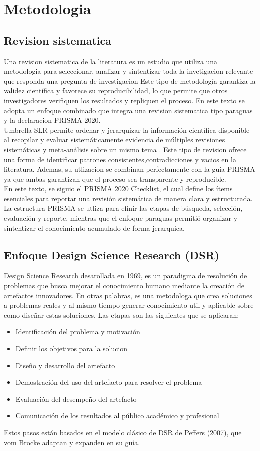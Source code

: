 \chapter{Metodologia}
\section{Revision sistematica}
Una revision sistematica de la literatura es un estudio 
que utiliza una metodologia para seleccionar, analizar y 
sintentizar toda la invetigacion relevante que responda una pregunta de investigacion 
Este tipo de metodología garantiza la validez científica y favorece su reproducibilidad, lo que permite que otros investigadores verifiquen los resultados 
y repliquen el proceso. En este texto se adopta un enfoque combinado que integra una revision sistematica
tipo paraguas y la declaracion PRISMA 2020.\\
Umbrella SLR permite ordenar y jerarquizar la información científica disponible al recopilar y evaluar sistemáticamente evidencia de múltiples revisiones sistemáticas y 
meta-análisis sobre un mismo tema \cite{Papatheodorou2019}. Este tipo de revision ofrece una forma de identificar patrones consistentes,contradicciones y vacios en la literatura. 
Ademas, su utlizacion se combinan perfectamente con la guia PRISMA ya que ambas garantizan que el proceso sea transparente y reproducible.\\
En este texto, se siguio el PRISMA 2020 Checklist, el cual define los ítems esenciales para reportar una revisión sistemática de manera clara y estructurada.
La estructura PRISMA se utliza para efinir las etapas de búsqueda, selección, evaluación y reporte, mientras que el enfoque paraguas permitió organizar y sintentizar el conocimiento acumulado de forma jerarquica.
\section{Enfoque Design Science Research (DSR)}
Design Science Research desarollada en 1969, es un paradigma de resolución de problemas que busca mejorar el 
conocimiento humano mediante la creación de artefactos innovadores. \cite{vomBrocke2020} En otras palabras, es una metodologa que crea soluciones a problemas  reales y al mismo tiempo generar
conocimiento util y aplicable sobre como diseñar estas soluciones. Las etapas son las siguientes que se aplicaran: 
\begin{itemize}
    \item Identificación del problema y motivación
    \item Definir los objetivos para la solucion
    \item Diseño y desarrollo del artefacto
    \item Demostración del uso del artefacto para resolver el problema
    \item Evaluación del desempeño del artefacto
    \item Comunicación de los resultados al público académico y profesional
\end{itemize}
Estos pasos están basados en el modelo clásico de DSR de Peffers (2007), que vom Brocke adaptan y expanden en su guía.

